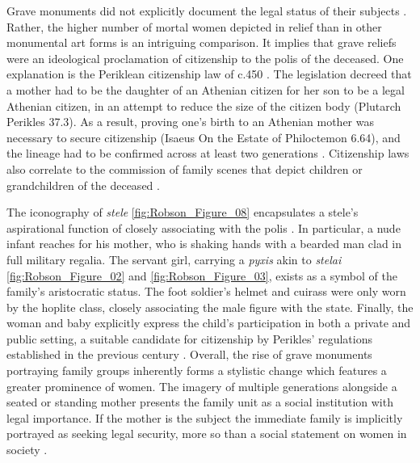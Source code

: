 Grave monuments did not explicitly document the legal status of their subjects \parencite[651]{Closterman2007}.
Rather, the higher number of mortal women depicted in relief than in other monumental art forms is an intriguing comparison. It implies that grave reliefs were an ideological proclamation of citizenship to the polis of the deceased. One explanation is the Periklean citizenship law of c.450 \BC.
The legislation decreed that a mother had to be the daughter of an Athenian citizen for her son to be a legal Athenian citizen, in an attempt to reduce the size of the citizen body (Plutarch Perikles 37.3). As a result, proving one’s birth to an Athenian mother was necessary to secure citizenship (Isaeus On the Estate of Philoctemon 6.64), and the lineage had to be confirmed across at least two generations \parencite[24]{Burton2003}.
Citizenship laws also correlate to the commission of family scenes that depict children or grandchildren of the deceased \parencite[25]{Burton2003}.

The iconography of \textit{stele} \ref{fig:Robson_Figure_08} encapsulates a stele’s aspirational function of closely associating with the polis \parencite[126]{Pomeroy1997}.
In particular, a nude infant reaches for his mother, who is shaking hands with a bearded man clad in full military regalia. The servant girl, carrying a \textit{pyxis} akin to \textit{stelai} \ref{fig:Robson_Figure_02} and \ref{fig:Robson_Figure_03}, exists as a symbol of the family’s aristocratic status.
The foot soldier’s helmet and cuirass were only worn by the hoplite class, closely associating the male figure with the state. Finally, the woman and baby explicitly express the child’s participation in both a private and public setting, a suitable candidate for citizenship by Perikles’ regulations established in the previous century \parencite[312]{Grossman2007}.
Overall, the rise of grave monuments portraying family groups inherently forms a stylistic change which features a greater prominence of women. The imagery of multiple generations alongside a seated or standing mother presents the family unit as a social institution with legal importance. If the mother is the subject the immediate family is implicitly portrayed as seeking legal security, more so than a social statement on women in society \parencite[60]{Boegehold1994}.

